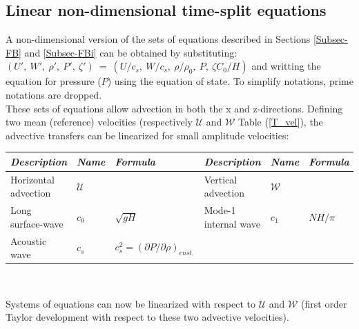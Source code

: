 \documentclass[a4paper]{article}
\numberwithin{equation}{section}
\begin{document}
\subsection{Linear non-dimensional time-split equations}
\label{SMadim}

A non-dimensional version of the sets of equations described in Sections \ref{Subsec-FB} and \ref{Subsec-FBi} can be obtained by substituting: $(U',\ W',\ \rho',\ P',\ \zeta')\ =\ (U/c_s,\ W/c_s,\ \rho/\rho_0,\ P,\ \zeta C_0/H)$ and writting the equation for pressure ($P$) using the equation of state. To simplify notations, prime notations are  dropped.\\

These sets of equations allow advection in both the x and z-directions. Defining two mean (reference) velocities (respectively $\mathcal{U}$ and $\mathcal{W}$ Table (\ref{T_vel}), the advective transfers can be linearized for small amplitude velocities:\\

    {\renewcommand{\arraystretch}{2}
    \begin{tabular}{|l|l|l|l|l|l|}
     \hline
     \textit{Description} & \textit{Name} & \textit{Formula} &
     \textit{Description} & \textit{Name} & \textit{Formula} \\
     \hline
     Horizontal advection & $\mathcal{U}$ &  &
     Vertical advection & $\mathcal{W}$  & \\
     Long surface-wave  & $c_0$ & $\sqrt{gH}$  &
     Mode-1 internal wave & $c_1$ & $NH/\pi$  \\ 
     Acoustic wave  &  $c_s$ & $c_s^2= (\partial{P}/\partial{\rho})_{enst.} $&
     & & \\
     \hline
    \end{tabular}}\\

    \label{T_vel} 
    
Systems of equations can now be linearized with respect to $\mathcal{U}$ and $\mathcal{W}$ (first order Taylor development with respect to these two advective velocities).
    
\end{document}
